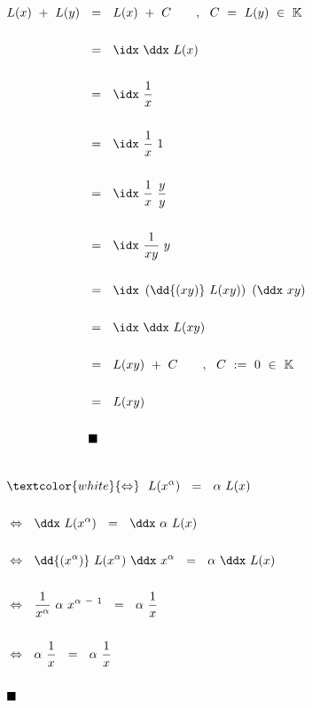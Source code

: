 \begin{description}[leftmargin=*, labelsep=3em, itemsep=3em]
	$\begin{aligned}[t]
	L(x) ~ + ~ L(y) ~~ &= ~~ L(x) ~ + ~ C \qquad, ~~ C ~ = ~ L(y) ~ \in ~ \mathbb{K} \\ \\
	&= ~~ \idx ~ \ddx ~ L(x) \\ \\
	&= ~~ \idx ~ \frac{1}{x} \\ \\
	&= ~~ \idx ~ \frac{1}{x} ~ 1 \\ \\
	&= ~~ \idx ~ \frac{1}{x} ~ \frac{y}{y} \\ \\
	&= ~~ \idx ~ \frac{1}{xy} ~ y \\ \\
	&= ~~ \idx ~ \left( \dd{(xy)} ~ L(xy) \right) ~ \left( \ddx ~ xy \right) \\ \\
	&= ~~ \idx ~ \ddx ~ L(xy) \\ \\
	&= ~~ L(xy) ~ + ~ C \qquad, ~~ C ~ := ~ 0 ~ \in ~ \mathbb{K} \\ \\
	&= ~~ L(xy) \\ \\
	 &\blacksquare
	\end{aligned}$ \\
	
	
	\newpage
	
	
	\item[\textnormal{c) \quad ii)}] \hfill
	
	~\\
	
	$\begin{aligned}[t]
	&\textcolor{white}{\Leftrightarrow} ~~ L(x^{\alpha}) ~~ = ~~ \alpha ~ L(x) \\ \\
	&\Leftrightarrow ~~ \ddx ~ L(x^{\alpha}) ~~ = ~~ \ddx ~ \alpha ~ L(x) \\ \\
	&\Leftrightarrow ~~ \dd{(x^{\alpha})} ~ L(x^{\alpha}) ~ \ddx ~ x^{\alpha} ~~ = ~~ \alpha ~ \ddx ~ L(x) \\ \\
	&\Leftrightarrow ~~ \frac{1}{x^{\alpha}} ~ \alpha ~ x^{\alpha ~ - ~ 1} ~~ = ~~ \alpha ~\frac{1}{x} \\ \\
	&\Leftrightarrow ~~ \alpha ~\frac{1}{x} ~~ = ~~ \alpha ~\frac{1}{x} \\ \\
	&\blacksquare
	\end{aligned}$ \\
	

\end{description}
